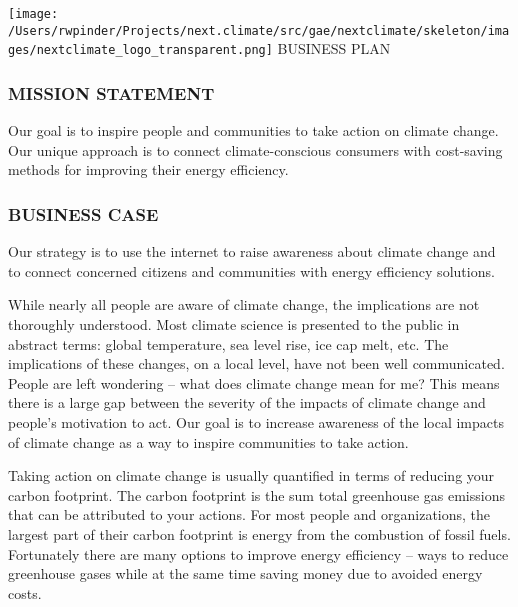 \documentclass[12pt]{article}
\begin{document}
\pagestyle{empty}
\renewcommand{\descriptionlabel}[1]{\hspace{\labelsep}\emph{#1}}
\begin{center}
\texttt{[image: /Users/rwpinder/Projects/next.climate/src/gae/nextclimate/skeleton/images/nextclimate\_logo\_transparent.png]}
\Large{BUSINESS PLAN}
\end{center}
\noindent


\subsubsection*{MISSION STATEMENT}

Our goal is to inspire people and communities to take action on
climate change. Our unique approach is to connect climate-conscious
consumers with cost-saving methods for improving their energy
efficiency.

\subsubsection*{BUSINESS CASE}

Our strategy is to use the internet to raise awareness about climate
change and to connect concerned citizens and communities with energy
efficiency solutions.

While nearly all people are aware of climate change, the implications
are not thoroughly understood. Most climate science is presented to
the public in abstract terms: global temperature, sea level rise, ice
cap melt, etc. The implications of these changes, on a local level,
have not been well communicated. People are left wondering -- what
does climate change mean for me? This means there is a large gap
between the severity of the impacts of climate change and people's
motivation to act. Our goal is to increase awareness of the local
impacts of climate change as a way to inspire communities to take
action.

Taking action on climate change is usually quantified in terms of
reducing your carbon footprint. The carbon footprint is the sum total
greenhouse gas emissions that can be attributed to your actions. For
most people and organizations, the largest part of their carbon
footprint is energy from the combustion of fossil fuels. Fortunately
there are many options to improve energy efficiency -- ways to reduce
greenhouse gases while at the same time saving money due to avoided
energy costs.
\end{document}
